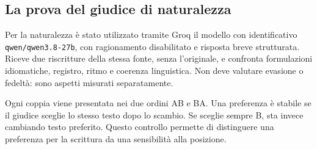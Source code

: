 \subsection{La prova del giudice di naturalezza}\label{la-prova-del-giudice-di-naturalezza}

Per la naturalezza è stato utilizzato tramite Groq il modello con identificativo \nolinkurl{qwen/qwen3.8-27b}, con ragionamento disabilitato e risposta breve strutturata. Riceve due riscritture della stessa fonte, senza l'originale, e confronta formulazioni idiomatiche, registro, ritmo e coerenza linguistica. Non deve valutare evasione o fedeltà: sono aspetti misurati separatamente.

Ogni coppia viene presentata nei due ordini AB e BA. Una preferenza è stabile se il giudice sceglie lo stesso testo dopo lo scambio. Se sceglie sempre B, sta invece cambiando testo preferito. Questo controllo permette di distinguere una preferenza per la scrittura da una sensibilità alla posizione.

